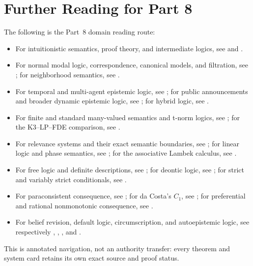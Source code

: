 \chapter*{Further Reading for Part 8}
\label{sec:p08-further-reading}

The following is the Part~8 domain reading route:
\begin{itemize}
  \item For intuitionistic semantics, proof theory, and intermediate logics,
        see \textcite{TroelstraVanDalen1988} and
        \textcite{ChagrovZakharyaschev1997}.
  \item For normal modal logic, correspondence, canonical models, and
        filtration, see \textcite{BlackburnDeRijkeVenema2001}; for
        neighborhood semantics, see \textcite{Pacuit2017}.
  \item For temporal and multi-agent epistemic logic, see
        \textcite{FaginHalpernMosesVardi1995}; for public announcements and
        broader dynamic epistemic logic, see
        \textcite{VanDitmarschVanDerHoekKooi2007}; for hybrid logic, see
        \textcite{ArecesTenCate2007}.
  \item For finite and standard many-valued semantics and t-norm logics, see
        \textcite{Hajek1998,CintulaHajekNoguera2011}; for the K3--LP--FDE
        comparison, see \textcite{OmoriWansing2017}.
  \item For relevance systems and their exact semantic boundaries, see
        \textcite{DunnRestall2002}; for linear logic and phase semantics, see
        \textcite{Girard1995}; for the associative Lambek calculus, see
        \textcite{Buszkowski2010}.
  \item For free logic and definite descriptions, see
        \textcite{Lambert1967,Russell1905}; for deontic logic, see
        \textcite{VonWright1951,McNamara2006}; for strict and variably strict
        conditionals, see \textcite{Stalnaker1968,Lewis1971,Lewis1973,Wen2019}.
  \item For paraconsistent consequence, see
        \textcite{Priest2006,OmoriWansing2017}; for da Costa's \(C_1\), see
        \textcite{daCosta1974}; for preferential and rational
        nonmonotonic consequence, see
        \textcite{KrausLehmannMagidor1990,LehmannMagidor1992}.
  \item For belief revision, default logic, circumscription, and
        autoepistemic logic, see respectively
        \textcite{AlchourronGardenforsMakinson1985,KatsunoMendelzon1991},
        \textcite{Reiter1980}, \textcite{McCarthy1980}, and
        \textcite{Moore1985}.
\end{itemize}

This is annotated navigation, not an authority transfer: every theorem and
system card retains its own exact source and proof status.
